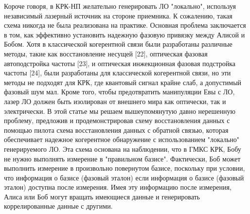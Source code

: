 Короче говоря, в КРК-НП желательно генерировать ЛО "локально", используя независимый лазерный источник на стороне приемника. К сожалению, такая схема никогда не была реализована на практике. Основная проблема заключается в том, как эффективно установить надежную фазовую привязку между Алисой и Бобом. Хотя в классической когерентной связи были разработаны различные методы, такие как восстановление несущей [22], оптическая фазовая автоподстройка частоты [23], и оптическая инжекционная фазовая подстройка частоты [24], были разработаны для классической когерентной связи, но эти методы не подходят для КРК, где квантовый сигнал крайне слаб, а допустимый фазовый шум мал.
Кроме того, чтобы предотвратить манипуляции Евы с ЛО, лазер ЛО должен быть изолирован от внешнего мира как оптически, так и электрически.
В этой статье мы решаем вышеупомянутую давно нерешенную проблему, предложив и продемонстрировав схему восстановления данных с помощью пилота схема восстановления данных с обратной связью, которая обеспечивает надежное когерентное обнаружение с использованием "локально" генерируемого ЛО.
Эта схема основана на наблюдении, что в ГМКС КРК, Бобу не нужно выполнять измерение в "правильном базисе". Фактически, Боб может выполнить измерение в произвольно повернутом базисе, поскольку при условии, что информация о базисе (фазовый эталон) если информация о базисе (фазовый эталон) доступна после измерения. Имея эту информацию  после измерения, Алиса или Боб могут вращать имеющиеся данные и генерировать коррелированные данные с другими. 
